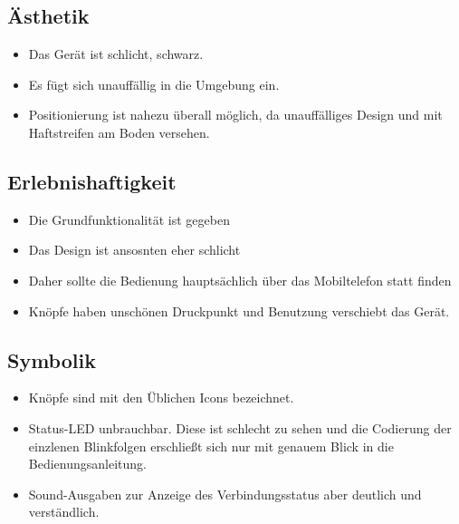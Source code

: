 \documentclass[a4paper,10pt]{article}
\begin{document}
\subsection{Ästhetik}
\begin{itemize}
\item Das Gerät ist schlicht, schwarz.
\item Es fügt sich unauffällig in die Umgebung ein.
\item Positionierung ist nahezu überall möglich, da unauffälliges Design und
mit Haftstreifen am Boden versehen.
\end{itemize}

\subsection{Erlebnishaftigkeit}
\begin{itemize}
\item Die Grundfunktionalität ist gegeben
\item Das Design ist ansosnten eher schlicht
\item Daher sollte die Bedienung hauptsächlich über das Mobiltelefon statt finden
\item Knöpfe haben unschönen Druckpunkt und Benutzung verschiebt das Gerät.
\end{itemize}

\subsection{Symbolik}
\begin{itemize}
\item Knöpfe sind mit den Üblichen Icons bezeichnet.
\item Status-LED unbrauchbar. Diese ist schlecht zu sehen und die Codierung der einzlenen Blinkfolgen erschließt sich nur mit genauem Blick in die Bedienungsanleitung.
\item Sound-Ausgaben zur Anzeige des Verbindungsstatus aber deutlich und verständlich.
\end{itemize}
\end{document}
